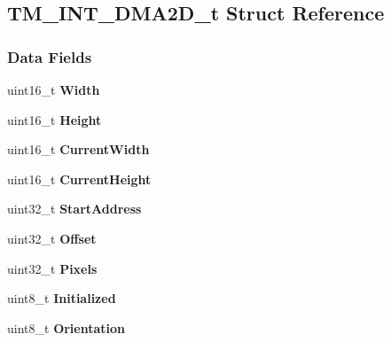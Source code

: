 \hypertarget{struct_t_m___i_n_t___d_m_a2_d__t}{}\subsection{T\+M\+\_\+\+I\+N\+T\+\_\+\+D\+M\+A2\+D\+\_\+t Struct Reference}
\label{struct_t_m___i_n_t___d_m_a2_d__t}
\subsubsection*{Data Fields}
\begin{DoxyCompactItemize}
\item 
\hypertarget{struct_t_m___i_n_t___d_m_a2_d__t_a9b3fe5d83fe7eb60cd86008934f65616}{}uint16\+\_\+t {\bfseries Width}\label{struct_t_m___i_n_t___d_m_a2_d__t_a9b3fe5d83fe7eb60cd86008934f65616}

\item 
\hypertarget{struct_t_m___i_n_t___d_m_a2_d__t_a1a634e0d0d740b55406a6c2c194a7bfc}{}uint16\+\_\+t {\bfseries Height}\label{struct_t_m___i_n_t___d_m_a2_d__t_a1a634e0d0d740b55406a6c2c194a7bfc}

\item 
\hypertarget{struct_t_m___i_n_t___d_m_a2_d__t_a9bb7cdfd63220791a439e7602d799c1a}{}uint16\+\_\+t {\bfseries Current\+Width}\label{struct_t_m___i_n_t___d_m_a2_d__t_a9bb7cdfd63220791a439e7602d799c1a}

\item 
\hypertarget{struct_t_m___i_n_t___d_m_a2_d__t_a059dfacfb4752536775dc377f89ceb21}{}uint16\+\_\+t {\bfseries Current\+Height}\label{struct_t_m___i_n_t___d_m_a2_d__t_a059dfacfb4752536775dc377f89ceb21}

\item 
\hypertarget{struct_t_m___i_n_t___d_m_a2_d__t_a9180a9bd6f1a05ff1e715d3d3dcabd48}{}uint32\+\_\+t {\bfseries Start\+Address}\label{struct_t_m___i_n_t___d_m_a2_d__t_a9180a9bd6f1a05ff1e715d3d3dcabd48}

\item 
\hypertarget{struct_t_m___i_n_t___d_m_a2_d__t_a674f76759cbcc4b3efb7f8db8aed67bb}{}uint32\+\_\+t {\bfseries Offset}\label{struct_t_m___i_n_t___d_m_a2_d__t_a674f76759cbcc4b3efb7f8db8aed67bb}

\item 
\hypertarget{struct_t_m___i_n_t___d_m_a2_d__t_a8315c5943c9d060d00a0491c96d18840}{}uint32\+\_\+t {\bfseries Pixels}\label{struct_t_m___i_n_t___d_m_a2_d__t_a8315c5943c9d060d00a0491c96d18840}

\item 
\hypertarget{struct_t_m___i_n_t___d_m_a2_d__t_a885a68e632ab9a6189c31f5f8a648f35}{}uint8\+\_\+t {\bfseries Initialized}\label{struct_t_m___i_n_t___d_m_a2_d__t_a885a68e632ab9a6189c31f5f8a648f35}

\item 
\hypertarget{struct_t_m___i_n_t___d_m_a2_d__t_ab6d1ef8dac285bc951e92b767c40ba91}{}uint8\+\_\+t {\bfseries Orientation}\label{struct_t_m___i_n_t___d_m_a2_d__t_ab6d1ef8dac285bc951e92b767c40ba91}

\end{DoxyCompactItemize}
